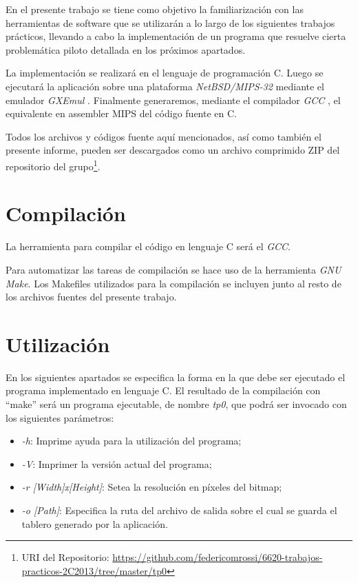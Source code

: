 \documentclass{article}
\begin{document}
	En el presente trabajo se tiene como objetivo la familiarización con las herramientas de software que se utilizarán a lo largo de los siguientes trabajos prácticos, llevando a cabo la implementación de un programa que resuelve cierta problemática piloto detallada en los próximos apartados.
	\par
	La implementación se realizará en el lenguaje de programación C. Luego se ejecutará la aplicación sobre una plataforma \textit{NetBSD/MIPS-32} mediante el emulador \textit{GXEmul} \cite{GXEMUL}. Finalmente generaremos, mediante el compilador \textit{GCC} \cite{GCC}, el equivalente en assembler MIPS del código fuente en C.
	\par
	Todos los archivos y códigos fuente aquí mencionados, así como también el presente informe, pueden ser descargados como un archivo comprimido ZIP del repositorio del grupo\footnote{URI del Repositorio: \url{https://github.com/federicomrossi/6620-trabajos-practicos-2C2013/tree/master/tp0}}.
\bigskip




\section{Compilación}
	
	La herramienta para compilar el código en lenguaje C será el \textit{GCC}.
	\par
	Para automatizar las tareas de compilación se hace uso de la herramienta \textit{GNU Make}. Los Makefiles utilizados para la compilación se incluyen junto al resto de los archivos fuentes del presente trabajo.
\bigskip




\section{Utilización}
	
	En los siguientes apartados se especifica la forma en la que debe ser ejecutado el programa implementado en lenguaje C. El resultado de la compilación con ``make'' será un programa ejecutable, de nombre \textit{tp0}, que podrá ser invocado con los siguientes parámetros:
\medskip

\begin{itemize}

\itemsep=2pt \topsep=0pt \partopsep=0pt \parskip=0pt \parsep=0pt
	\item \textit{-h}:  Imprime ayuda para la utilización del programa;
	\item \textit{-V}:  Imprimer la versión actual del programa;
	\item \textit{-r [Width]x[Height]}: Setea la resolución en píxeles del bitmap;
	\item \textit{-o [Path]}: Especifica la ruta del archivo de salida sobre el cual se guarda el tablero generado por la aplicación.

\end{itemize}
\medskip
\end{document}
